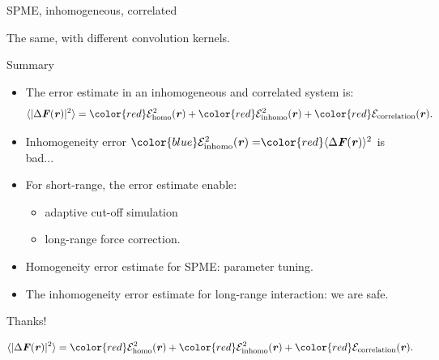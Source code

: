 \documentclass{beamer}
\newcommand{\redc}[1]{{\color{red} #1}}
\newcommand{\bluec}[1]{{\color{blue} #1}}
\renewcommand{\v}[1]{\textbf{\textit{#1}}}
\begin{document}
\begin{frame}{SPME, inhomogeneous, correlated}
  \centerline{
    The \redc{same}, with different convolution kernels.}
\end{frame}

\begin{frame}{Summary}
  \begin{itemize}\itemsep -10pt
  \item<1-> The error estimate in an inhomogeneous and correlated system is:
    \bluec{
      \begin{align*} \nonumber
        \langle\vert\Delta\v F(\v r)\vert^2\rangle
        = 
        \redc{\mathcal E^2_{\textrm{homo}}(\v r)} +
        \redc{\mathcal E^2_{\textrm{inhomo}}(\v r)} +
        \redc{\mathcal E_{\textrm{correlation}}(\v r)}.
      \end{align*}
    }
  \item<2-> Inhomogeneity error $ \bluec{\mathcal E^2_{\textrm{inhomo}}(\v
      r) = }\redc{\langle\Delta\v F(\v r)\rangle^2}$ is bad...
    \vfill
  \item<3-> For short-range, the error estimate enable:
    \begin{itemize}
    \item \redc{adaptive cut-off simulation} 
    \item \redc{long-range force correction}.
    \end{itemize}
    \vfill
  \item<4-> Homogeneity error estimate for SPME: \redc{parameter tuning}.
    \vfill
  \item<5-> The inhomogeneity error estimate for long-range interaction:
    we are \redc{safe}.
    \vfill
  \end{itemize}
\end{frame}


\begin{frame}
  \vfill
  \centerline{ \Huge
    Thanks! }
  \vfill
  \bluec{
    \begin{align*} \nonumber
      \langle\vert\Delta\v F(\v r)\vert^2\rangle
      = 
      \redc{\mathcal E^2_{\textrm{homo}}(\v r)} +
      \redc{\mathcal E^2_{\textrm{inhomo}}(\v r)} +
      \redc{\mathcal E_{\textrm{correlation}}(\v r)}.
    \end{align*}
  }
\end{frame}
\end{document}
